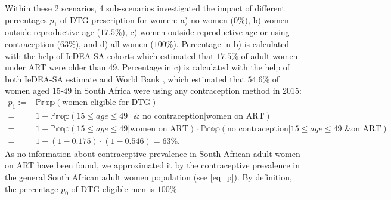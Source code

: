 \documentclass{article}
\begin{document}
Within these 2 scenarios, 4 sub-scenarios investigated the impact of different percentages $p_1$ of DTG-prescription for women: a) no women ($0\%$), b) women outside reproductive age ($17.5\%$), c) women outside reproductive age or using contraception ($63 \%$), and d) all women ($100\%$). Percentage in b) is calculated with the help of IeDEA-SA cohorts \cite{Egger2012} which estimated that $17.5\%$ of adult women under ART were older than 49. Percentage in c) is calculated with the help of both IeDEA-SA estimate and World Bank \cite{WorldBank2015}, which estimated that $54.6\%$ of women aged 15-49 in South Africa were using any contraception method in 2015: \begin{equation}
\begin{aligned}\label{eq_p}
p_1:=&\mathbb{Prop}(\text{women eligible for DTG})\\
=& 1-\mathbb{Prop}(15\leq age\leq 49 \text{ }\& \text{ no contraception}|\text{women on ART})\\
=& 1-\mathbb{Prop}(15\leq age\leq 49|\text{women on ART})\cdot \mathbb{Prop}(\text{no contraception}| 15\leq age\leq 49  \text{ \& on ART})\\
=& 1-(1-0.175)\cdot (1-0.546)=63\% .
\end{aligned}
\end{equation}
As no information about contraceptive prevalence in South African adult women on ART have been found, we approximated it by the contraceptive prevalence in the general South African adult women population (see \ref{eq_p}). By definition, the percentage $p_0$ of DTG-eligible men is $100\%$.
\end{document}
